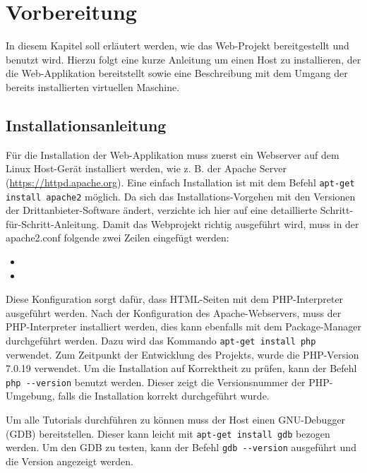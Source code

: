 \chapter{Vorbereitung}
In diesem Kapitel soll erläutert werden, wie das Web-Projekt bereitgestellt und benutzt wird. Hierzu folgt eine kurze Anleitung um einen Host zu installieren, der die Web-Applikation bereitstellt sowie eine Beschreibung mit dem Umgang der bereits installierten virtuellen Maschine.

\section{Installationsanleitung}

Für die Installation der Web-Applikation muss zuerst ein Webserver auf dem Linux Host-Gerät installiert werden, wie z. B. der Apache Server (\url{https://httpd.apache.org}). Eine einfach Installation ist mit dem Befehl \colorbox{altgray}{\lstinline|apt-get install apache2|} möglich. Da sich das Installations-Vorgehen mit den Versionen der Drittanbieter-Software ändert, verzichte ich hier auf eine detaillierte Schritt-für-Schritt-Anleitung. Damit das Webprojekt richtig ausgeführt wird, muss in der apache2.conf folgende zwei Zeilen eingefügt werden:\medskip

\begin{itemize}
	\item {}
	\item {}\medskip
\end{itemize}
	
Diese Konfiguration sorgt dafür, dass HTML-Seiten mit dem PHP-Interpreter ausgeführt werden. Nach der Konfiguration des Apache-Webservers, muss der PHP-Interpreter installiert werden, dies kann ebenfalls mit dem Package-Manager durchgeführt werden. Dazu wird das Kommando \colorbox{altgray}{\lstinline|apt-get install php|} verwendet. Zum Zeitpunkt der Entwicklung des Projekts, wurde die PHP-Version 7.0.19 verwendet. Um die Installation auf Korrektheit zu prüfen, kann der Befehl \colorbox{altgray}{\lstinline|php --version|} benutzt werden. Dieser zeigt die Versionsnummer der PHP-Umgebung, falls die Installation korrekt durchgeführt wurde.\medskip

Um alle Tutorials durchführen zu können muss der Host einen GNU-Debugger (GDB) bereitstellen. Dieser kann leicht mit  \colorbox{altgray}{\lstinline|apt-get install gdb|} bezogen werden. Um den GDB zu testen, kann der Befehl \colorbox{altgray}{\lstinline|gdb --version|} ausgeführt und die Version angezeigt werden.\medskip

